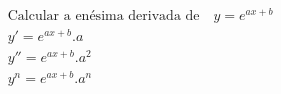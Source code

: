 \begin{ex}
\begin{align}
&\text{Calcular a enésima derivada de} \quad y=e^{ax+b}\nonumber\\
&y'=e^{ax+b}.a\nonumber\\
&y''=e^{ax+b}.a^2\nonumber\\
&y^{n}=e^{ax+b}.a^{n}\nonumber
\end{align}
\end{ex}
